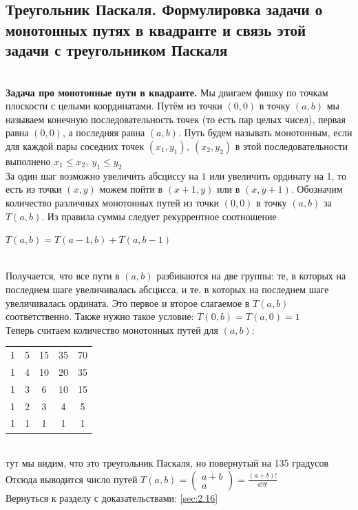 \documentclass[a4paper]{article}
\makeatletter
\newcommand\binomialCoefficient[2]{%
    \c@pgf@counta=#1%
    \c@pgf@countb=#2%
    \c@pgf@countc=\c@pgf@counta%
    \advance\c@pgf@countc by-\c@pgf@countb%
    \ifnum\c@pgf@countb>\c@pgf@countc%
        \c@pgf@countb=\c@pgf@countc%
    \fi%
    \c@pgf@countc=1%
    \c@pgf@countd=0%
    \pgfmathloop%
        \ifnum\c@pgf@countd<\c@pgf@countb%
        \multiply\c@pgf@countc by\c@pgf@counta%
        \advance\c@pgf@counta by-1%
        \advance\c@pgf@countd by1%
        \divide\c@pgf@countc by\c@pgf@countd%
    \repeatpgfmathloop%
    \the\c@pgf@countc%
}
\makeatother
\begin{document}
\subsection{Треугольник Паскаля. Формулировка задачи о монотонных путях в квадранте и связь этой задачи
с треугольником Паскаля}
\label{sec:1.37}\\[2mm]
\indent\textbf{Задача про монотонные пути в квадранте.}
Мы двигаем фишку по точкам плоскости с целыми координатами. Путём из точки $(0,0)$ в точку $(a, b)$ мы называем конечную последовательность точек (то есть пар целых чисел), первая равна $(0,0)$, а последняя равна $(a,b)$. Путь будем называть монотонным, если для каждой пары соседних точек $(x_1, y_1),\ (x_2, y_2)$ в этой последовательности выполнено $x_1\leqslant x_2,\ y_1\leqslant y_2$\\[2mm]
\indent За один шаг возможно увеличить абсциссу на $1$ или увеличить ординату на 1, то есть из точки $(x, y)$ можем пойти в $(x + 1, y)$ или в $(x, y + 1)$. Обозначим количество различных монотонных путей из точки $(0, 0)$ в точку $(a, b)$ за $T(a, b)$. Из правила суммы следует рекуррентное соотношение\\[2mm]
\label{sec:1.37.1}\centerline{$T(a,b)=T(a-1,b)+T(a,b-1)$}\\[2mm]
\indent Получается, что все пути в $(a, b)$ разбиваются на две группы: те, в которых на последнем шаге увеличивалась абсцисса, и те, в которых на последнем шаге увеличивалась ордината. Это первое и второе слагаемое в $T(a,b)$ соответственно. Также нужно такое условие: $T(0,b)=T(a,0)=1$\\[2mm]
\indent Теперь считаем количество монотонных путей для $(a,b):$\\[2mm]
\begin{tabular}{ccccc}
     1& 5 &15  &35  &70 \\
    1 &4  &10  &20  &35 \\
     1& 3 &6  &10  &15 \\
     1& 2 &3  &4  &5 \\
     1& 1 & 1 & 1 &1 \\
\end{tabular}\\[2mm]
 тут мы видим, что это треугольник Паскаля, но повернутый на 135 градусов\\[2mm]
\indent Отсюда выводится число путей $T(a,b)=\begin{pmatrix}
    a+b\\
    a
\end{pmatrix}=\frac{(a+b)!}{a!b!}$\\[2mm]
Вернуться к разделу с доказательствами: \ref{sec:2.16}
\end{document}
